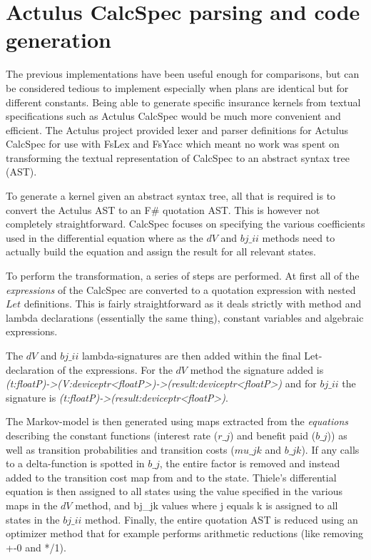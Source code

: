 \section{Actulus CalcSpec parsing and code generation}
The previous implementations have been useful enough for comparisons, but can be considered tedious to implement especially when plans are identical but for different constants.
Being able to generate specific insurance kernels from textual specifications such as Actulus CalcSpec would be much more convenient and efficient.
The Actulus project provided lexer and parser definitions for Actulus CalcSpec for use with FsLex and FsYacc\cite{fslexfsyacc} which meant no work was spent on transforming the textual representation of CalcSpec to an abstract syntax tree (AST).

To generate a kernel given an abstract syntax tree, all that is required is to convert the Actulus AST to an F\# quotation AST.
This is however not completely straightforward.
CalcSpec focuses on specifying the various coefficients used in the differential equation where as the $dV$ and $bj\_ii$ methods need to actually build the equation and assign the result for all relevant states.

To perform the transformation, a series of steps are performed.
At first all of the \emph{expressions} of the CalcSpec are converted to a quotation expression with nested $Let$ definitions.
This is fairly straightforward as it deals strictly with method and lambda declarations (essentially the same thing), constant variables and algebraic expressions.


The $dV$ and $bj\_ii$ lambda-signatures are then added within the final Let-declaration of the expressions.
For the $dV$ method the signature added is \textit{(t:floatP)-\textgreater{}(V:deviceptr\textless{}floatP\textgreater{})-\textgreater{}(result:deviceptr\textless{}floatP\textgreater{})} and for $bj\_ii$ the signature is \textit{(t:floatP)-\textgreater{}(result:deviceptr\textless{}floatP\textgreater{})}.

The Markov-model is then generated using maps extracted from the \emph{equations} describing the constant functions (interest rate ($r\_j$) and benefit paid ($b\_j$)) as well as transition probabilities and transition costs ($mu\_jk$ and $b\_jk$).
If any calls to a delta-function is spotted in $b\_j$, the entire factor is removed and instead added to the transition cost map from and to the state.
Thiele's differential equation is then assigned to all states using the value specified in the various maps in the $dV$ method, and bj\_jk values where j equals k is assigned to all states in the $bj\_ii$ method.
Finally, the entire quotation AST is reduced using an optimizer method that for example performs arithmetic reductions (like removing +-0 and */1).

